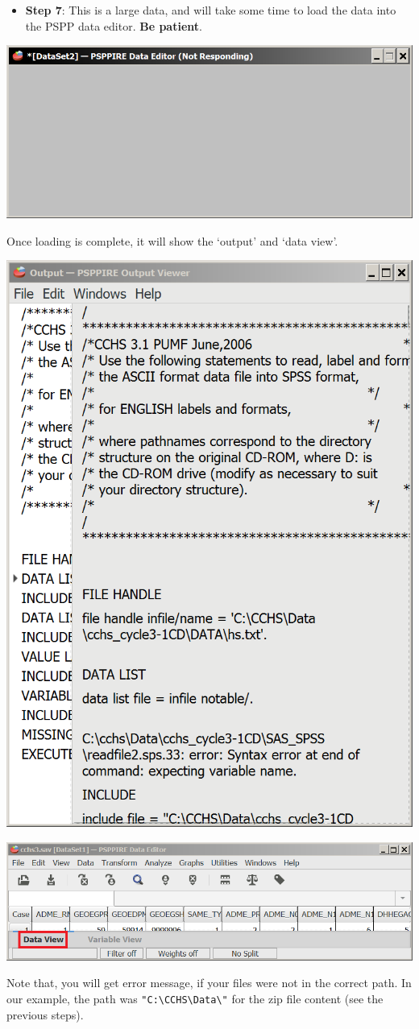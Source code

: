 \documentclass[
]{book}
\providecommand{\tightlist}{%
  \setlength{\itemsep}{0pt}\setlength{\parskip}{0pt}}
\begin{document}
\begin{itemize}
\tightlist
\item
  \textbf{Step 7}: This is a large data, and will take some time to load the data into the PSPP data editor. \textbf{Be patient}.
\end{itemize}

\includegraphics[width=0.65\linewidth]{images/waitX}

Once loading is complete, it will show the `output' and `data view'.

\includegraphics[width=0.65\linewidth]{images/abacusNew}

\includegraphics[width=0.65\linewidth]{images/abacus36}

Note that, you will get error message, if your files were not in the correct path. In our example, the path was \texttt{"C:\textbackslash{}CCHS\textbackslash{}Data\textbackslash{}"} for the zip file content (see the previous steps).
\end{document}
